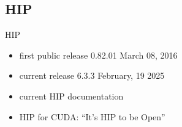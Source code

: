 \subsection{HIP}

HIP
\begin{itemize}
    \item first public release 0.82.01 March 08, 2016~\cite{advanced_micro_devices_release_2016}
    \item current release 6.3.3 February, 19 2025~\cite{advanced_micro_devices_release_2025}
    \item current HIP documentation~\cite{advanced_micro_devices_hip_nodate}
    \item HIP for CUDA: \enquote{It’s HIP to be Open}~\cite{advanced_micro_devices_its_2016}
\end{itemize}